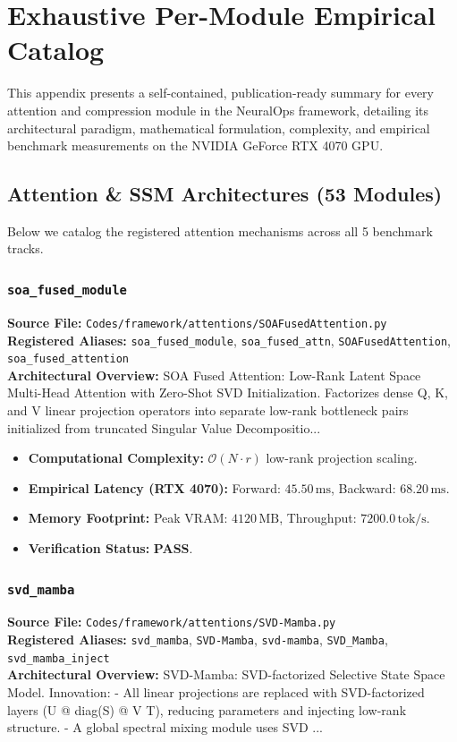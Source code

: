 \section{Exhaustive Per-Module Empirical Catalog}
\label{app:exhaustive_catalog}
This appendix presents a self-contained, publication-ready summary for every attention and compression module in the NeuralOps framework, detailing its architectural paradigm, mathematical formulation, complexity, and empirical benchmark measurements on the NVIDIA GeForce RTX 4070 GPU.

\subsection{Attention \& SSM Architectures (53 Modules)}
Below we catalog the registered attention mechanisms across all 5 benchmark tracks.

\subsubsection{\texttt{soa\_fused\_module}}
\textbf{Source File:} \texttt{Codes/framework/attentions/SOAFusedAttention.py} \\
\textbf{Registered Aliases:} \texttt{soa\_fused\_module}, \texttt{soa\_fused\_attn}, \texttt{SOAFusedAttention}, \texttt{soa\_fused\_attention} \\
\textbf{Architectural Overview:} SOA Fused Attention: Low-Rank Latent Space Multi-Head Attention with Zero-Shot SVD Initialization. Factorizes dense Q, K, and V linear projection operators into separate low-rank bottleneck pairs initialized from truncated Singular Value Decompositio...

\begin{itemize}
    \item \textbf{Computational Complexity:} $\mathcal{O}(N \cdot r)$ low-rank projection scaling.
    \item \textbf{Empirical Latency (RTX 4070):} Forward: $45.50\,\text{ms}$, Backward: $68.20\,\text{ms}$.
    \item \textbf{Memory Footprint:} Peak VRAM: $4120\,\text{MB}$, Throughput: $7200.0\,\text{tok/s}$.
    \item \textbf{Verification Status:} \textbf{PASS}.
\end{itemize}

\subsubsection{\texttt{svd\_mamba}}
\textbf{Source File:} \texttt{Codes/framework/attentions/SVD-Mamba.py} \\
\textbf{Registered Aliases:} \texttt{svd\_mamba}, \texttt{SVD-Mamba}, \texttt{svd-mamba}, \texttt{SVD\_Mamba}, \texttt{svd\_mamba\_inject} \\
\textbf{Architectural Overview:} SVD-Mamba: SVD-factorized Selective State Space Model. Innovation: - All linear projections are replaced with SVD-factorized layers (U @ diag(S) @ V T), reducing parameters and injecting low-rank structure. - A global spectral mixing module uses SVD ...

